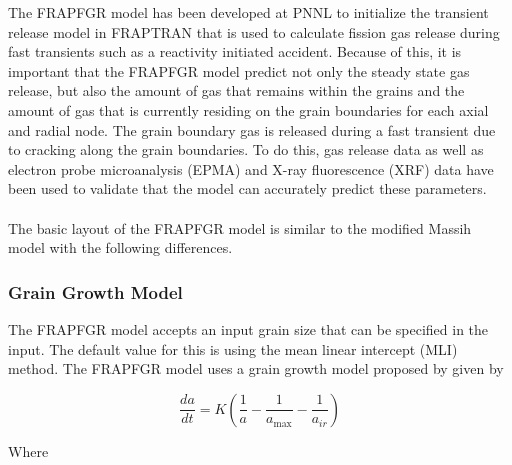 The FRAPFGR model has been developed at PNNL to initialize the transient release model in FRAPTRAN
that is used to calculate fission gas release during fast transients such as a reactivity initiated
accident. Because of this, it is important that the FRAPFGR model predict not only the steady state
gas release, but also the amount of gas that remains within the grains and the amount of gas that is
currently residing on the grain boundaries for each axial and radial node. The grain boundary gas is
released during a fast transient due to cracking along the grain boundaries. To do this, gas release
data as well as electron probe microanalysis (EPMA) and X-ray fluorescence (XRF) data have been used
to validate that the model can accurately predict these parameters.
\\
\\
The basic layout of the FRAPFGR model is similar to the modified Massih model with the following
differences.

\subsubsection{Grain Growth Model}\label{grain-growth-model}

The FRAPFGR model accepts an input grain size that can be specified in the input. The default value
for this is  using the mean linear intercept (MLI) method. The FRAPFGR model
uses a grain growth model proposed by \cite{ref:Khorushii1999} given by

\begin{equation}
    \label{eq:FRAPFGR_grain_growth}
    \frac{da}{dt} = K\left( \frac{1}{a} - \frac{1}{a_{\max}} - \frac{1}{a_{ir}} \right)
\end{equation}

Where

